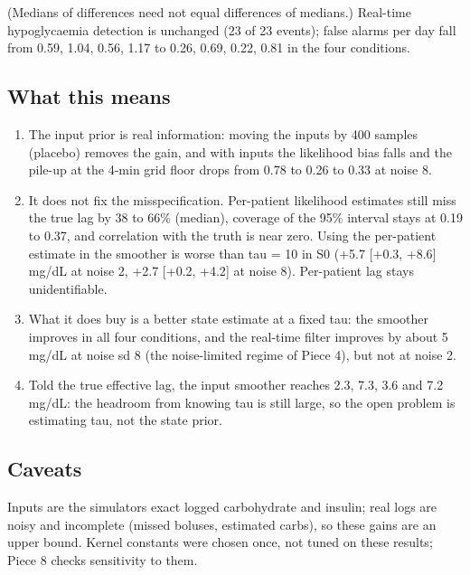 \documentclass[11pt,a4paper]{article}
\providecommand{\tightlist}{\setlength{\itemsep}{0pt}\setlength{\parskip}{0pt}}
\begin{document}
(Medians of differences need not equal differences of medians.)
Real-time hypoglycaemia detection is unchanged (23 of 23 events); false
alarms per day fall from 0.59, 1.04, 0.56, 1.17 to 0.26, 0.69, 0.22,
0.81 in the four conditions.

\hypertarget{what-this-means}{%
\subsection{What this means}\label{what-this-means}}

\begin{enumerate}
\def\labelenumi{\arabic{enumi}.}
\tightlist
\item
  The input prior is real information: moving the inputs by 400 samples
  (placebo) removes the gain, and with inputs the likelihood bias falls
  and the pile-up at the 4-min grid floor drops from 0.78 to 0.26 to
  0.33 at noise 8.
\item
  It does not fix the misspecification. Per-patient likelihood estimates
  still miss the true lag by 38 to 66\% (median), coverage of the 95\%
  interval stays at 0.19 to 0.37, and correlation with the truth is near
  zero. Using the per-patient estimate in the smoother is worse than tau
  = 10 in S0 (+5.7 {[}+0.3, +8.6{]} mg/dL at noise 2, +2.7 {[}+0.2,
  +4.2{]} at noise 8). Per-patient lag stays unidentifiable.
\item
  What it does buy is a better state estimate at a fixed tau: the
  smoother improves in all four conditions, and the real-time filter
  improves by about 5 mg/dL at noise sd 8 (the noise-limited regime of
  Piece 4), but not at noise 2.
\item
  Told the true effective lag, the input smoother reaches 2.3, 7.3, 3.6
  and 7.2 mg/dL: the headroom from knowing tau is still large, so the
  open problem is estimating tau, not the state prior.
\end{enumerate}

\hypertarget{caveats}{%
\subsection{Caveats}\label{caveats}}

Inputs are the simulator\textquotesingle s exact logged carbohydrate and
insulin; real logs are noisy and incomplete (missed boluses, estimated
carbs), so these gains are an upper bound. Kernel constants were chosen
once, not tuned on these results; Piece 8 checks sensitivity to them.
\end{document}

